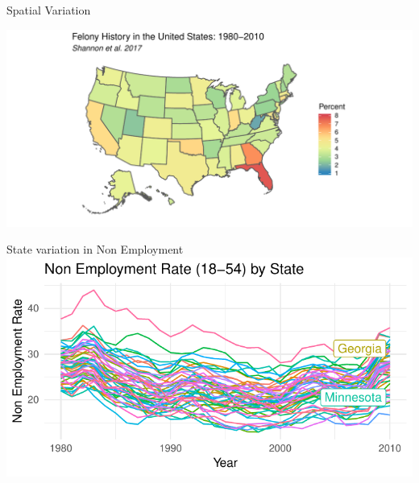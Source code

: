\documentclass{beamer}\usepackage[]{graphicx}\usepackage[]{color}
\makeatletter
\def\maxwidth{ %
  \ifdim\Gin@nat@width>\linewidth
    \linewidth
  \else
    \Gin@nat@width
  \fi
}
\newenvironment{knitrout}{}{} %
\makeatother
\begin{document}
\begin{frame}{Spatial Variation}




\begin{knitrout}
\color{fgcolor}
\includegraphics[width=\maxwidth]{figure/unnamed-chunk-5-1} 

\end{knitrout}

\end{frame}

\begin{frame}{State variation in Non Employment}
\begin{knitrout}
\color{fgcolor}
\includegraphics[width=\maxwidth]{figure/unnamed-chunk-6-1} 

\end{knitrout}
\end{frame}
\end{document}
